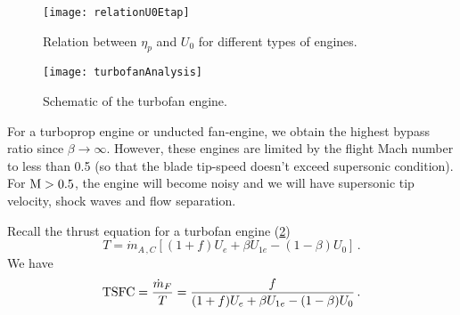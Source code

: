 \begin{figure}[!htb!]
 \centering
    {\texttt{[image: relationU0Etap]}}
    \caption{\label{FIG_RELATION_U0ETAP}Relation between $\eta_p$ and $U_0$ for different types of engines.}
\end{figure}

\begin{figure}[!htb!]
 \centering
    {\texttt{[image: turbofanAnalysis]}}
    \caption{\label{FIG_TURBOFAN_ANALYSIS}Schematic of the turbofan engine.}
\end{figure}

For a turboprop engine or unducted fan-engine, we obtain the highest bypass ratio since $\beta\to\infty$. However, these engines are limited by the flight Mach number to less than 0.5 (so that the blade tip-speed doesn't exceed supersonic condition). For ${\rm{M}} > 0.5$, the engine will become noisy and we will have supersonic tip velocity, shock waves and flow separation. 

Recall the thrust equation for a turbofan engine (\cref{FIG_TURBOFAN_ANALYSIS})
\begin{equation}
   T = \dot{m}_{A\,,C} \left[ (1+f) U_e + \beta U_{1e} - (1-\beta) U_0 \right] \, \text{.}
\end{equation}
We have
\begin{equation}
  \text{TSFC} = {\frac{\dot{m}_F}{T}} = {\frac{f}{(1+f)U_e+\beta U_{1e} - (1-\beta)U_0}}\,.
\end{equation}

